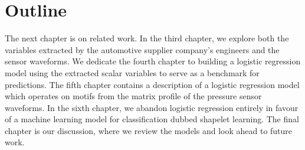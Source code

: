 \section{Outline}

The next chapter is on related work.
In the third chapter, we explore both the variables extracted by the automotive supplier company's engineers and the sensor waveforms.
We dedicate the fourth chapter to building a logistic regression model using the extracted scalar variables to serve as a benchmark for predictions.
The fifth chapter contains a description of a logistic regression model which operates on motifs from the matrix profile of the pressure sensor waveforms.
In the sixth chapter, we abandon logistic regression entirely in favour of a machine learning model for classification dubbed shapelet learning.
The final chapter is our discussion, where we review the models and look ahead to future work.
